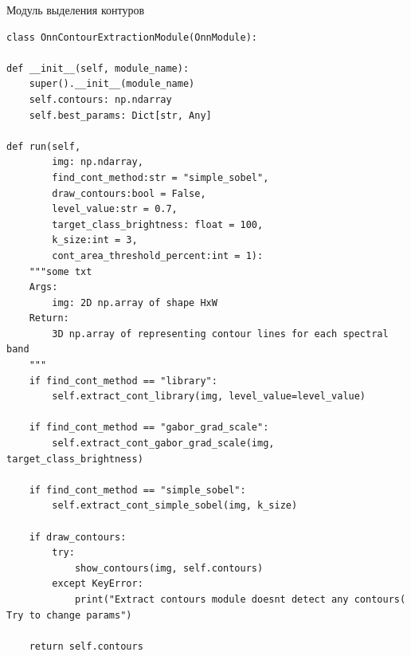 \documentclass[14pt, russian]{scrartcl}
\begin{document}
\begin{listing}[!htt]
    \caption{Модуль выделения контуров}
    \label{lst:contour_extr}
    \begin{verbatim}
class OnnContourExtractionModule(OnnModule):

def __init__(self, module_name):
    super().__init__(module_name)
    self.contours: np.ndarray
    self.best_params: Dict[str, Any]

def run(self, 
        img: np.ndarray, 
        find_cont_method:str = "simple_sobel", 
        draw_contours:bool = False,
        level_value:str = 0.7,
        target_class_brightness: float = 100,
        k_size:int = 3,
        cont_area_threshold_percent:int = 1):
    """some txt
    Args:
        img: 2D np.array of shape HxW
    Return:
        3D np.array of representing contour lines for each spectral band
    """
    if find_cont_method == "library":
        self.extract_cont_library(img, level_value=level_value)

    if find_cont_method == "gabor_grad_scale":
        self.extract_cont_gabor_grad_scale(img, target_class_brightness)

    if find_cont_method == "simple_sobel":
        self.extract_cont_simple_sobel(img, k_size)

    if draw_contours:
        try:
            show_contours(img, self.contours)
        except KeyError:
            print("Extract contours module doesnt detect any contours( Try to change params")

    return self.contours
    \end{verbatim}
\end{listing}
\end{document}
